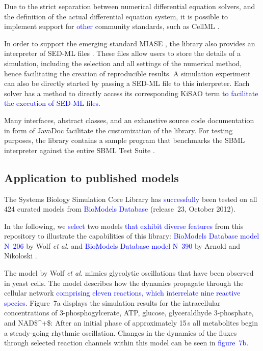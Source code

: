 \documentclass[10pt]{bmc_article}
\newcommand{\numero}{\mbox{N\hspace{-0.075em}\raisebox{0.25em}{\relsize{-2}\b{o}}}}
\newenvironment{bmcformat}{\fussy\setboolean{publ}{true}}{\fussy}
\newcommand{\COR}[1]                      {\textcolor{blue}{#1}}
\begin{document}
\begin{bmcformat}
Due to the strict separation between numerical differential equation solvers,
and the definition of the actual differential equation system, it is possible to
implement support for \COR{other} community standards, such as CellML
\cite{Lloyd2004}.

In order to support the emerging standard \acf{MIASE} \cite{Waltemath2011a}, the
library also provides an interpreter of \acf{SED-ML} files \cite{Waltemath2011}.
These files allow users to store the details of a simulation, including the
selection and all settings of the numerical method, hence facilitating the
creation of reproducible results.
A simulation experiment can also be directly started by passing a \acs{SED-ML} file to
this interpreter.
Each solver has a method to directly access its corresponding \acf{KiSAO} term \cite{Courtot2011}
\COR{to facilitate the execution of \acs{SED-ML} files}.

Many interfaces, abstract classes, and an exhaustive source code documentation
in form of JavaDoc facilitate the customization of the library.
For testing purposes, the library contains a sample program that benchmarks the
\acs{SBML} interpreter against the entire SBML Test Suite \COR{\cite{SBMLtestSuite2013}}.


\subsection*{Application to published models}

The Systems Biology Simulation Core Library has \COR{successfully} been tested on all 424 curated
models from \COR{BioModels Database} (release~23, October 2012).

In the following, we \COR{select} two models \COR{that exhibit diverse features}
from this repository to illustrate the capabilities of this library:
\COR{BioModels Database model \numero~206} by Wolf \emph{et al.} \cite{Wolf2000} and
\COR{BioModels Database model \numero~390} by Arnold 
and Nikoloski \cite{Arnold2011}.

The model by Wolf \emph{et al.} \cite{Wolf2000} mimics glycolytic oscillations
that have been observed in yeast cells.
The model describes how the dynamics propagate through the cellular network
\COR{comprising eleven reactions, which interrelate nine reactive species}.
Figure~7a displays the simulation results for the intracellular concentrations
of 3-phosphogylcerate, \acs{ATP}, glucose, glyceraldhyde 3-phosphate, and 
\acs{NAD$^+$}:
After an initial phase of approximately 15\,s all metabolites begin a
steady-going rhythmic oscillation.
Changes in the dynamics of the fluxes through selected reaction channels within
this model can be seen in \COR{figure~7b}. 


\end{bmcformat}
\end{document}
